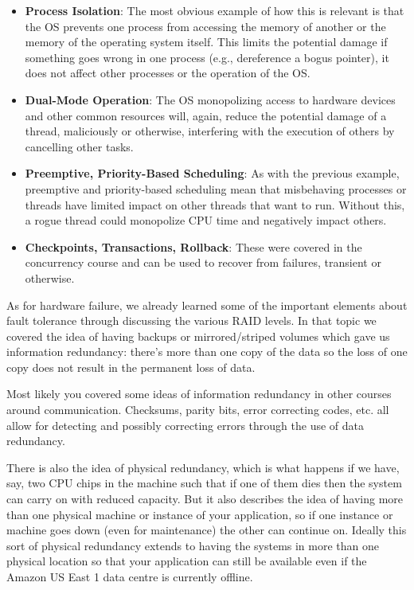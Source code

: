 \begin{itemize}

	\item \textbf{Process Isolation}: The most obvious example of how this is relevant is that the OS prevents one process from accessing the memory of another or the memory of the operating system itself. This limits the potential damage if something goes wrong in one process (e.g., dereference a bogus pointer), it does not affect other processes or the operation of the OS. 
	
	\item \textbf{Dual-Mode Operation}: The OS monopolizing access to hardware devices and other common resources will, again, reduce the potential damage of a thread, maliciously or otherwise, interfering with the execution of others by cancelling other tasks.
	
	\item \textbf{Preemptive, Priority-Based Scheduling}: As with the previous example, preemptive and priority-based scheduling mean that misbehaving processes or threads have limited impact on other threads that want to run. Without this, a rogue thread could monopolize CPU time and negatively impact others.
	
	\item \textbf{Checkpoints, Transactions, Rollback}: These were covered in the concurrency course and can be used to recover from failures, transient or otherwise. 
\end{itemize}

As for hardware failure, we already learned some of the important elements about fault tolerance through discussing the various RAID levels. In that topic we covered the idea of having backups or mirrored/striped volumes which gave us information redundancy: there's more than one copy of the data so the loss of one copy does not result in the permanent loss of data. 

Most likely you covered some ideas of information redundancy in other courses around communication. Checksums, parity bits, error correcting codes, etc. all allow for detecting and possibly correcting errors through the use of data redundancy.

There is also the idea of physical redundancy, which is what happens if we have, say, two CPU chips in the machine such that if one of them dies then the system can carry on with reduced capacity. But it also describes the idea of having more than one physical machine or instance of your application, so if one instance or machine goes down (even for maintenance) the other can continue on. Ideally this sort of physical redundancy extends to having the systems in more than one physical location so that your application can still be available even if the Amazon US East 1 data centre is currently offline.

